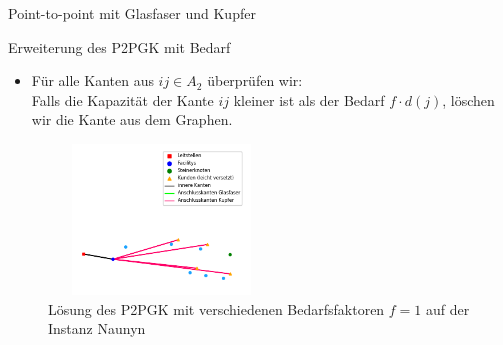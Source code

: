 \documentclass{beamer}
\begin{document}
	\begin{frame}{Point-to-point mit Glasfaser und Kupfer}
	\end{frame}
	
	\begin{frame}{Erweiterung des P2PGK mit Bedarf}
		\begin{itemize}
			\item F\"ur alle Kanten aus $ij \in A_2$ \"uberpr\"ufen wir:\\
			Falls die Kapazit\"at der Kante $ij$ kleiner ist als der Bedarf  $f \cdot d(j)$,
			l\"oschen wir die Kante aus dem Graphen.
		\end{itemize}
\begin{figure}[h]
	\centering
		\includegraphics[height=4cm, width=6cm]{./Bilder/P2PGK_Naunyn_demand1_duration0}
	\caption{Lösung des P2PGK mit verschiedenen Bedarfsfaktoren $f = 1$ auf der Instanz Naunyn}
\end{figure}
	\end{frame}
	
\end{document}
